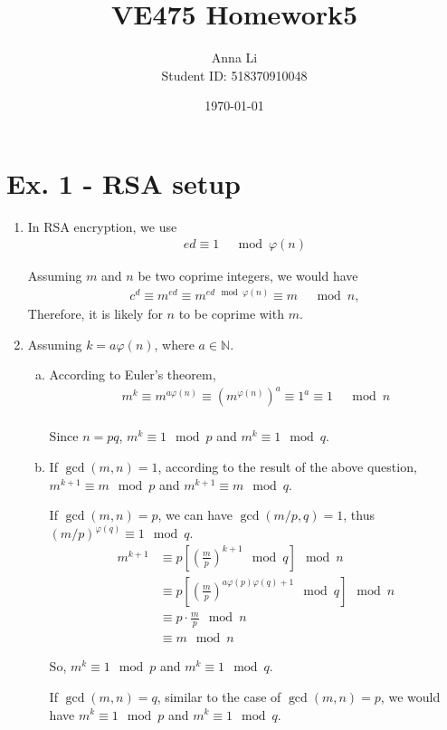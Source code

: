 \documentclass[a4paper,12pt]{journal}
\title{VE475 Homework5}
\author{Anna Li \\Student ID: 518370910048}
\date{\today}
\begin{document}
	\maketitle
		\section*{Ex. 1 - RSA setup}
		\begin{enumerate}
			\item In RSA encryption, we use
			\begin{align*}
				ed \equiv 1 &\mod \varphi(n)
			\end{align*}
			\par Assuming $m$ and $n$ be two coprime integers, we would have
			\begin{align*}
				c^{d} \equiv m^{ed} \equiv m^{ed \mod \varphi(n)} \equiv m &\mod n,
			\end{align*}
			Therefore, it is likely for $n$ to be coprime with $m$.
			
			\item Assuming $k = a\varphi(n)$, where $a \in \mathbb{N}$. %
			\begin{enumerate}[a)]
				\item According to Euler's theorem,
				\begin{align*}
					m^{k} \equiv m^{a\varphi(n)} \equiv  (m^{\varphi(n)})^{a} \equiv 1^a \equiv 1 &\mod n \\
				\end{align*}
				\par Since $n = pq$,  $m^{k} \equiv 1 \mod p$ and $m^{k} \equiv 1 \mod q$.
				
				\item If $\gcd(m,n) = 1$, according to the result of the above question,  $m^{k+1} \equiv m \mod p$ and $m^{k+1} \equiv m \mod q$.
				\par If $\gcd(m,n) = p$, we can have $\gcd(m/p, q) = 1$, thus $(m/p)^{\varphi(q)} \equiv 1 \mod q$.
				\begin{align*}
					m^{k+1} &\equiv  p \left[\left(\frac{m}{p}\right)^{k+1} \mod q\right] \mod n \\
					&\equiv p \left[\left(\frac{m}{p}\right)^{a\varphi(p)\varphi(q)+1} \mod q\right] \mod n \\
					&\equiv p \cdot \frac{m}{p} \mod n \\
					&\equiv m \mod n
				\end{align*}
				\par So, $m^{k} \equiv 1 \mod p$ and $m^{k} \equiv 1 \mod q$.
				\par If $\gcd(m,n) = q$, similar to the case of $\gcd(m,n) = p$, we would have  $m^{k} \equiv 1 \mod p$ and $m^{k} \equiv 1 \mod q$.
			\end{enumerate}
			

\end{enumerate}
\end{document}
